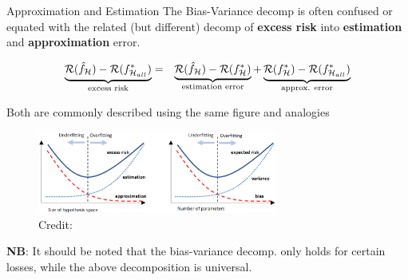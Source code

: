 \documentclass[11pt,compress,t,notes=noshow, xcolor=table]{beamer}
\begin{document}
\begin{vbframe}{Approximation and Estimation  }
The Bias-Variance decomp is often confused or equated with the related (but different) decomp of \textbf{excess risk} into \textbf{estimation} and \textbf{approximation} error.
\vspace{-0.3cm}

\begin{eqnarray*}
    \underbrace{\mathcal{R}(\hat f_{\mathcal{H}}) - \mathcal{R}(f^{\ast}_{\mathcal{H}_{all}})}_{\text{excess risk}} &=& \underbrace{\mathcal{R}(\hat f_{\mathcal{H}}) - \mathcal{R}(f^{\ast}_{\mathcal{H}})}_{\text{estimation error}} + \underbrace{\mathcal{R}(f^{\ast}_{\mathcal{H}}) -  \mathcal{R}(f^{\ast}_{\mathcal{H}_{all}})}_{\text{approx. error}} 
\end{eqnarray*}

Both are commonly described using the same figure and analogies
\vspace{-0.1cm}
\begin{figure}
    \centering
    \includegraphics[width = 0.7\textwidth]{figure_man/biasvar-vs-estapprox-tradeoff.png}
    \tiny{\\ Credit: \cite{BROWN2024BIAS}}
  \end{figure}

{\footnotesize \textbf{NB}: It should be noted that the bias-variance decomp. only holds for certain losses, while the above decomposition is universal.}

\end{vbframe}

\end{document}
